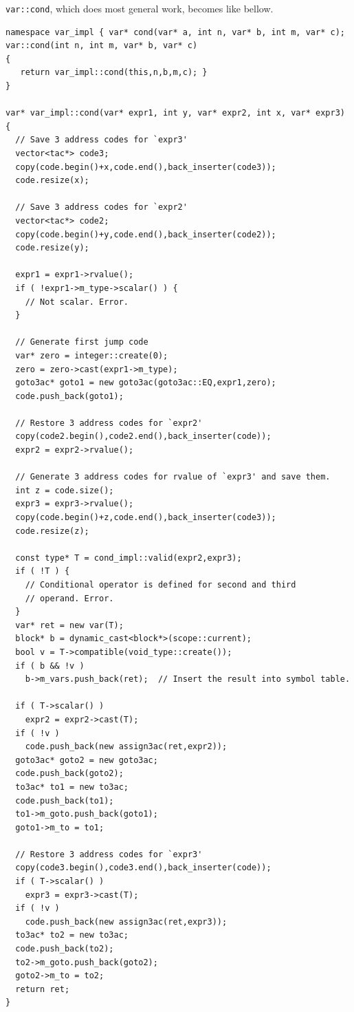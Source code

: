 {\tt{var::cond}}, which does most general work, becomes like bellow.
\begin{verbatim}
namespace var_impl { var* cond(var* a, int n, var* b, int m, var* c);
var::cond(int n, int m, var* b, var* c)
{
   return var_impl::cond(this,n,b,m,c); }
}

var* var_impl::cond(var* expr1, int y, var* expr2, int x, var* expr3)
{
  // Save 3 address codes for `expr3'
  vector<tac*> code3;
  copy(code.begin()+x,code.end(),back_inserter(code3));
  code.resize(x);

  // Save 3 address codes for `expr2'
  vector<tac*> code2;
  copy(code.begin()+y,code.end(),back_inserter(code2));
  code.resize(y);

  expr1 = expr1->rvalue();
  if ( !expr1->m_type->scalar() ) {
    // Not scalar. Error.
  }

  // Generate first jump code
  var* zero = integer::create(0);
  zero = zero->cast(expr1->m_type);
  goto3ac* goto1 = new goto3ac(goto3ac::EQ,expr1,zero);
  code.push_back(goto1);

  // Restore 3 address codes for `expr2'
  copy(code2.begin(),code2.end(),back_inserter(code));
  expr2 = expr2->rvalue();

  // Generate 3 address codes for rvalue of `expr3' and save them.
  int z = code.size();
  expr3 = expr3->rvalue();
  copy(code.begin()+z,code.end(),back_inserter(code3));
  code.resize(z);

  const type* T = cond_impl::valid(expr2,expr3);
  if ( !T ) {
    // Conditional operator is defined for second and third
    // operand. Error.
  }
  var* ret = new var(T);
  block* b = dynamic_cast<block*>(scope::current);
  bool v = T->compatible(void_type::create());
  if ( b && !v )
    b->m_vars.push_back(ret);  // Insert the result into symbol table.

  if ( T->scalar() )
    expr2 = expr2->cast(T);
  if ( !v )
    code.push_back(new assign3ac(ret,expr2));
  goto3ac* goto2 = new goto3ac;
  code.push_back(goto2);
  to3ac* to1 = new to3ac;
  code.push_back(to1);
  to1->m_goto.push_back(goto1);
  goto1->m_to = to1;

  // Restore 3 address codes for `expr3'
  copy(code3.begin(),code3.end(),back_inserter(code));
  if ( T->scalar() )
    expr3 = expr3->cast(T);
  if ( !v )
    code.push_back(new assign3ac(ret,expr3));
  to3ac* to2 = new to3ac;
  code.push_back(to2);
  to2->m_goto.push_back(goto2);
  goto2->m_to = to2;
  return ret;
}
\end{verbatim}

